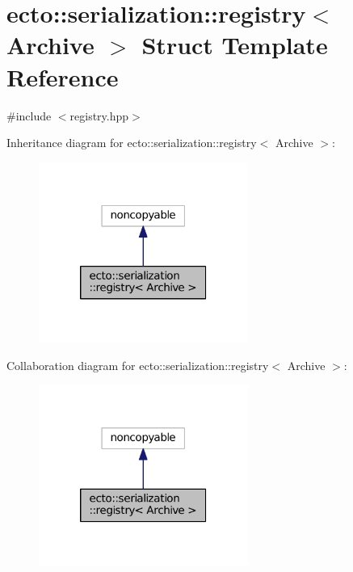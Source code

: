 \hypertarget{structecto_1_1serialization_1_1registry}{\section{ecto\-:\-:serialization\-:\-:registry$<$ Archive $>$ Struct Template Reference}
\label{structecto_1_1serialization_1_1registry}
}


{\ttfamily \#include $<$registry.\-hpp$>$}



Inheritance diagram for ecto\-:\-:serialization\-:\-:registry$<$ Archive $>$\-:\nopagebreak
\begin{figure}[H]
\begin{center}
\leavevmode
\includegraphics[width=194pt]{structecto_1_1serialization_1_1registry__inherit__graph}
\end{center}
\end{figure}


Collaboration diagram for ecto\-:\-:serialization\-:\-:registry$<$ Archive $>$\-:\nopagebreak
\begin{figure}[H]
\begin{center}
\leavevmode
\includegraphics[width=194pt]{structecto_1_1serialization_1_1registry__coll__graph}
\end{center}
\end{figure}
